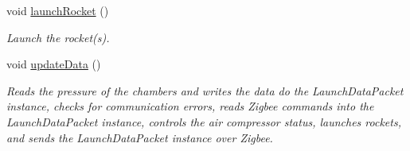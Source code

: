 \begin{DoxyCompactItemize}
void \hyperlink{launchPad_8ino_a891f6d0bdccb9622acbd6ecf0d825a73}{launch\-Rocket} ()
\begin{DoxyCompactList}\small\item\em \-Launch the rocket(s). \end{DoxyCompactList}\item 
void \hyperlink{launchPad_8ino_a389fed96244d8611aad3f0000e947be4}{update\-Data} ()
\begin{DoxyCompactList}\small\item\em \-Reads the pressure of the chambers and writes the data do the \-Launch\-Data\-Packet instance, checks for communication errors, reads \-Zigbee commands into the \-Launch\-Data\-Packet instance, controls the air compressor status, launches rockets, and sends the \-Launch\-Data\-Packet instance over \-Zigbee. \end{DoxyCompactList}\end{DoxyCompactItemize}
